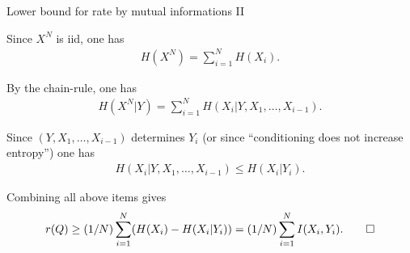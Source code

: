 \begin{frame}{Lower bound for rate by mutual informations II}
\bit
\item Since $X^N$ is iid, one has
\begin{align*}
H(X^N)=\sum_{i=1}^NH(X_i).
\end{align*}
\item By the chain-rule, one has
\begin{align*}
H(X^N|Y)=\sum_{i=1}^NH(X_i|Y,X_1,\dots,X_{i-1}).
\end{align*}
\item Since $(Y,X_1,\dots,X_{i-1})$ determines $Y_i$ (or since ``conditioning does not increase entropy'') one has
\begin{align*}
H(X_i|Y,X_1,\dots,X_{i-1})\leq H(X_i|Y_i).  
\end{align*}
\item Combining all above items gives
\begin{align*}
r(Q)\geq (1/N) \sum_{i=1}^N(H(X_i)-H(X_i|Y_i))=(1/N) \sum_{i=1}^NI(X_i,Y_i). \qed
\end{align*}
\eit 
\end{frame}

